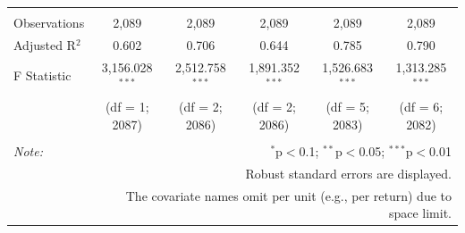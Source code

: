 \documentclass{article}
\begin{document}
\begin{tabular}{@{\extracolsep{.001pt}}lccccc}
  & & & & & \\ 
\hline \\[-1.8ex] 
Observations & 2,089 & 2,089 & 2,089 & 2,089 & 2,089 \\ 
Adjusted R$^{2}$ & 0.602 & 0.706 & 0.644 & 0.785 & 0.790 \\ 
F Statistic & 3,156.028$^{***}$  & 2,512.758$^{***}$  & 1,891.352$^{***}$  & 1,526.683$^{***}$  & 1,313.285$^{***}$  \\ 
 & (df = 1; 2087) & (df = 2; 2086) & (df = 2; 2086) & (df = 5; 2083) & (df = 6; 2082) \\
\hline 
\hline \\[-1.8ex] 
\textit{Note:}  & \multicolumn{5}{r}{$^{*}$p$<$0.1; $^{**}$p$<$0.05; $^{***}$p$<$0.01} \\ 
 & \multicolumn{5}{r}{Robust standard errors are displayed.} \\ 
 & \multicolumn{5}{r}{The covariate names omit per unit (e.g., per return) due to space limit.} \\ 
\end{tabular} 
\endgroup 
\end{document}

